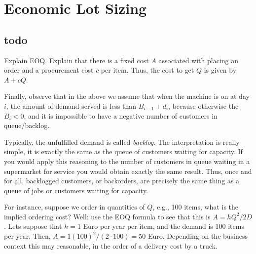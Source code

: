 \section{Economic Lot Sizing}
\label{sec:deterministic}


\subsection{todo}


Explain EOQ. Explain that there is a fixed cost $A$ associated with placing an order and a procurement cost $c$  per item. Thus, the cost to get $Q$ is given by $A+c Q$.




Finally, observe that in the above we assume that when the machine is
on at day $i$, the  amount of demand served is  less than $B_{i-1}+d_i$, because otherwise
the $B_i<0$, and it is impossible to have a negative number of
customers in queue/backlog. 


Typically, the unfulfilled demand is called \emph{backlog}. The
interpretation is really simple, it is exactly the same as the queue
of customers waiting for capacity. If you would apply this reasoning
to the number of customers in queue waiting in a supermarket for
service you would obtain exactly the same result. Thus, once and for
all, backlogged customers, or backorders, are precisely the same thing
as a queue of jobs or customers waiting for capacity.

For instance,
      suppose we order in quantities of $Q$, e.g., 100 items, what is
      the implied ordering cost?  Well: use the EOQ formula to see
      that this is $A=hQ^2/2D$.  Lets suppose that $h=1$ Euro per year
      per item, and the demand is 100 items per year. Then,
      $A=1(100)^2/(2\cdot 100) = 50$ Euro. Depending on the business
      context this may reasonable, in the order of a delivery cost by
      a truck.


